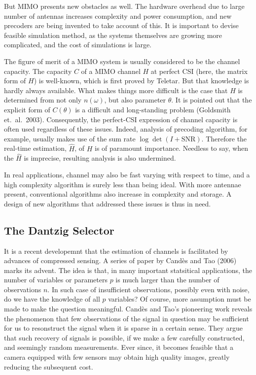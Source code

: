 \documentclass[12pt]{article}
\begin{document}
But MIMO presents new obstacles as well.
The hardware overhead due to large number of antennas increases complexity and power consumption, and new precoders are being invented to take account of this.
It is important to devise feasible simulation method, as the systems themselves are growing more complicated, and the cost of simulations is large.

The figure of merit of a MIMO system is usually considered to be the channel capacity.
The capacity \(C\) of a MIMO channel \(H\) at perfect CSI (here, the matrix form of \(H\)) is well-known, which is first proved by Teletar.
But that knowledge is hardly always available.
What makes things more difficult is the case that \(H\) is determined from not only \(n(\omega)\), but also parameter \(\theta\).
It is pointed out that the explicit form of \(C(\theta)\) is a difficult and long-standing problem (Goldsmith et.\ al.\ 2003).
Consequently, the perfect-CSI expression of channel capacity is often used regardless of these issues.
Indeed, analysis of precoding algorithm, for example, usually makes use of the sum rate \(\log \det (I +\mathrm{SNR})\).
Therefore the real-time estimation, \(\hat{H}\), of \(H\) is of paramount importance.
Needless to say, when the \(\hat{H}\) is imprecise, resulting analysis is also undermined.

In real applications, channel may also be fast varying with respect to time, and a high complexity algorithm is surely less than being ideal.
With more antennae present, conventional algorithms also increase in complexity and storage.
A design of new algorithms that addressed these issues is thus in need.

\subsection{The Dantzig Selector}

It is a recent developemnt that the estimation of channels is facilitated by advances of compressed sensing.
A series of paper by Cand\`es and Tao (2006) marks its advent.
The idea is that, in many important statsitical applications, the number of variables or parameters \(p\) is much larger than the number of observations \(n\).
In such case of insufficient observations, possibly even with noise, do we have the knowledge of all \(p\) variables?
Of course, more assumption must be made to make the question meaningful.
Cand\`es and Tao's pioneering work reveals the phenomenon that few observations of the signal in question may be sufficient for us to resonstruct the signal when it is sparse in a certain sense.
They argue that such recovery of signals is possible, if we make a few carefully constructed, and seemingly random measurements.
Ever since, it becomes feasible that a camera equipped with few sensors may obtain high quality images, greatly reducing the subsequent cost.
\end{document}
